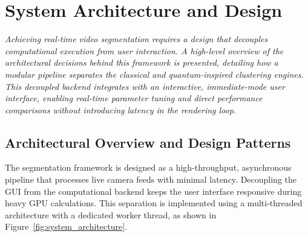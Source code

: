 \chapter{System Architecture and Design}
{\itshape Achieving real-time video segmentation requires a design that decouples computational execution from user interaction. A high-level overview of the architectural decisions behind this framework is presented, detailing how a modular pipeline separates the classical and quantum-inspired clustering engines. This decoupled backend integrates with an interactive, immediate-mode user interface, enabling real-time parameter tuning and direct performance comparisons without introducing latency in the rendering loop.}

\section{Architectural Overview and Design Patterns}
The segmentation framework is designed as a high-throughput, asynchronous pipeline that processes live camera feeds with minimal latency. Decoupling the GUI from the computational backend keeps the user interface responsive during heavy GPU calculations. This separation is implemented using a multi-threaded architecture with a dedicated worker thread, as shown in Figure~\ref{fig:system_architecture}.

